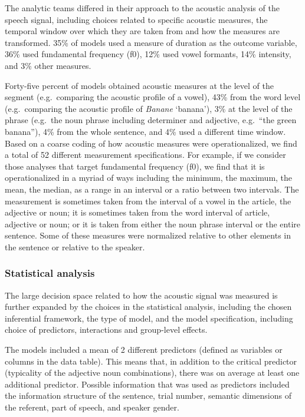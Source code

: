 \documentclass[Review,times,sageh]{sagej}
\begin{document}
The analytic teams differed in their approach to the acoustic analysis of the speech signal, including choices related to specific acoustic measures, the temporal window over which they are taken from and how the measures are transformed.
35\% of models used a measure of duration as the outcome variable, 36\% used fundamental frequency (f0), 12\% used vowel formants, 14\% intensity, and 3\% other measures.

Forty-five percent of models obtained acoustic measures at the level of the segment (e.g.~comparing the acoustic profile of a vowel), 43\% from the word level (e.g.~comparing the acoustic profile of \emph{Banane} `banana'), 3\% at the level of the phrase (e.g.~the noun phrase including determiner and adjective, e.g.~``the green banana''), 4\% from the whole sentence, and 4\% used a different time window.
Based on a coarse coding of how acoustic measures were operationalized, we find a total of 52 different measurement specifications.
For example, if we consider those analyses that target fundamental frequency (f0), we find that it is operationalized in a myriad of ways including the minimum, the maximum, the mean, the median, as a range in an interval or a ratio between two intervals.
The measurement is sometimes taken from the interval of a vowel in the article, the adjective or noun; it is sometimes taken from the word interval of article, adjective or noun; or it is taken from either the noun phrase interval or the entire sentence.
Some of these measures were normalized relative to other elements in the sentence or relative to the speaker.

\hypertarget{statistical-analysis}{%
\subsubsection{Statistical analysis}\label{statistical-analysis}}

The large decision space related to how the acoustic signal was measured is further expanded by the choices in the statistical analysis, including the chosen inferential framework, the type of model, and the model specification, including choice of predictors, interactions and group-level effects.

The models included a mean of 2 different predictors (defined as variables or columns in the data table).
This means that, in addition to the critical predictor (typicality of the adjective noun combinations), there was on average at least one additional predictor.
Possible information that was used as predictors included the information structure of the sentence, trial number, semantic dimensions of the referent, part of speech, and speaker gender.
\end{document}
